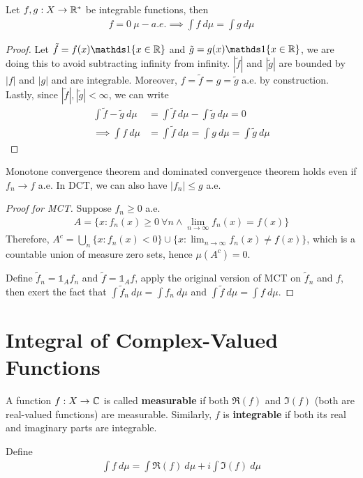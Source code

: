 \documentclass[11pt]{article}
\newcommand{\dmu}[0]{\ d\mu}
\begin{document}
	\begin{corollary}
		Let $f, g: X \to \mathbb{R}^*$ be integrable functions, then
		\begin{align}
			f = 0\ \mu-a.e. \implies \int f\ d\mu = \int g\ d\mu 
		\end{align}
		\begin{proof}
			Let $\tilde{f} = f(x) \id{x \in \R}$ and $\tilde{g} = g(x) \id{x \in \R}$, we are doing this to avoid subtracting infinity from infinity. $|\tilde{f}|$ and $|\tilde{g}|$ are bounded by $|f|$ and $|g|$ and are integrable. Moreover, $f = \tilde{f} = g = \tilde{g}$ a.e. by construction. Lastly, since $|\tilde{f}|, |\tilde{g}| < \infty$, we can write
			\begin{align}
				\int \tilde{f} - \tilde{g}\ d\mu &= \int \tilde{f}\ d\mu - \int \tilde{g}\ d\mu = 0 \\
				\implies \int f\ d\mu &= \int \tilde{f}\ d\mu = \int g\dmu = \int \tilde{g}\dmu
			\end{align}
		\end{proof}
	\end{corollary}
	
	\begin{proposition}
		Monotone convergence theorem and dominated convergence theorem holds even if $f_n \to f$ a.e. In DCT, we can also have $|f_n| \leq g$ a.e.
		\begin{proof}[Proof for MCT]
			Suppose $f_n \geq 0$ a.e.
			\begin{align}
				A = \{x: f_n(x) \geq 0\ \forall n \land \lim_{n\to\infty} f_n(x) = f(x)\}
			\end{align}
			Therefore, $A^c = \bigcup_{n} \{x:f_n(x) < 0\} \cup \{x: \lim_{n\to\infty} f_n(x) \neq f(x)\}$, which is a countable union of measure zero sets, hence $\mu(A^c) = 0$.
			
			Define $\tilde{f}_n = \mathds{1}_A f_n$ and $\tilde{f} = \mathds{1}_A f$, apply the original version of MCT on $\tilde{f}_n$ and $f$, then exert the fact that $\int \tilde{f}_n\dmu = \int f_n\dmu$ and $\int \tilde{f}\dmu = \int f\dmu$.
		\end{proof}
	\end{proposition}
	
	\section{Integral of Complex-Valued Functions}
	\begin{definition}
		A function $f: X \to \mathbb{C}$ is called \textbf{measurable} if both $\Re(f)$ and $\Im(f)$ (both are real-valued functions) are measurable. Similarly, $f$ is \textbf{integrable} if both its real and imaginary parts are integrable. 
		
		Define
		\begin{align}
			\int f\dmu = \int \Re(f)\dmu + i \int \Im(f)\dmu
		\end{align}
	\end{definition}
	
\end{document}
